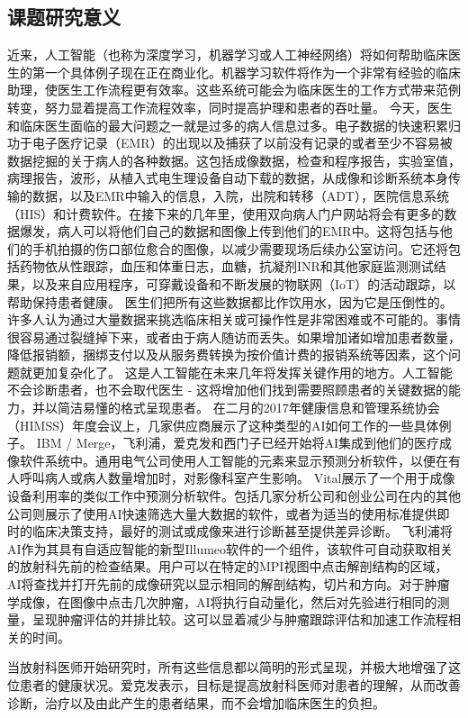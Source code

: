 \subsection{课题研究意义}
近来，人工智能（也称为深度学习，机器学习或人工神经网络）将如何帮助临床医生的第一个具体例子现在正在商业化。机器学习软件将作为一个非常有经验的临床助理，使医生工作流程更有效率。这些系统可能会为临床医生的工作方式带来范例转变，努力显着提高工作流程效率，同时提高护理和患者的吞吐量。
今天，医生和临床医生面临的最大问题之一就是过多的病人信息过多。电子数据的快速积累归功于电子医疗记录（EMR）的出现以及捕获了以前没有记录的或者至少不容易被数据挖掘的关于病人的各种数据。这包括成像数据，检查和程序报告，实验室值，病理报告，波形，从植入式电生理设备自动下载的数据，从成像和诊断系统本身传输的数据，以及EMR中输入的信息，入院，出院和转移（ADT），医院信息系统（HIS）和计费软件。在接下来的几年里，使用双向病人门户网站将会有更多的数据爆发，病人可以将他们自己的数据和图像上传到他们的EMR中。这将包括与他们的手机拍摄的伤口部位愈合的图像，以减少需要现场后续办公室访问。它还将包括药物依从性跟踪，血压和体重日志，血糖，抗凝剂INR和其他家庭监测测试结果，以及来自应用程序，可穿戴设备和不断发展的物联网（IoT）的活动跟踪，以帮助保持患者健康。
医生们把所有这些数据都比作饮用水，因为它是压倒性的。许多人认为通过大量数据来挑选临床相关或可操作性是非常困难或不可能的。事情很容易通过裂缝掉下来，或者由于病人随访而丢失。如果增加诸如增加患者数量，降低报销额，捆绑支付以及从服务费转换为按价值计费的报销系统等因素，这个问题就更加复杂化了。
这是人工智能在未来几年将发挥关键作用的地方。人工智能不会诊断患者，也不会取代医生 - 这将增加他们找到需要照顾患者的关键数据的能力，并以简洁易懂的格式呈现患者。
在二月的2017年健康信息和管理系统协会（HIMSS）年度会议上，几家供应商展示了这种类型的AI如何工作的一些具体例子。 IBM / Merge，飞利浦，爱克发和西门子已经开始将AI集成到他们的医疗成像软件系统中。通用电气公司使用人工智能的元素来显示预测分析软件，以便在有人呼叫病人或病人数量增加时，对影像科室产生影响。 Vital展示了一个用于成像设备利用率的类似工作中预测分析软件。包括几家分析公司和创业公司在内的其他公司则展示了使用AI快速筛选大量大数据的软件，或者为适当的使用标准提供即时的临床决策支持，最好的测试或成像来进行诊断甚至提供差异诊断。
飞利浦将AI作为其具有自适应智能的新型Illumeo软件的一个组件，该软件可自动获取相关的放射科先前的检查结果。用户可以在特定的MPI视图中点击解剖结构的区域，AI将查找并打开先前的成像研究以显示相同的解剖结构，切片和方向。对于肿瘤学成像，在图像中点击几次肿瘤，AI将执行自动量化，然后对先验进行相同的测量，呈现肿瘤评估的并排比较。这可以显着减少与肿瘤跟踪评估和加速工作流程相关的时间。

当放射科医师开始研究时，所有这些信息都以简明的形式呈现，并极大地增强了这位患者的健康状况。爱克发表示，目标是提高放射科医师对患者的理解，从而改善诊断，治疗以及由此产生的患者结果，而不会增加临床医生的负担。

